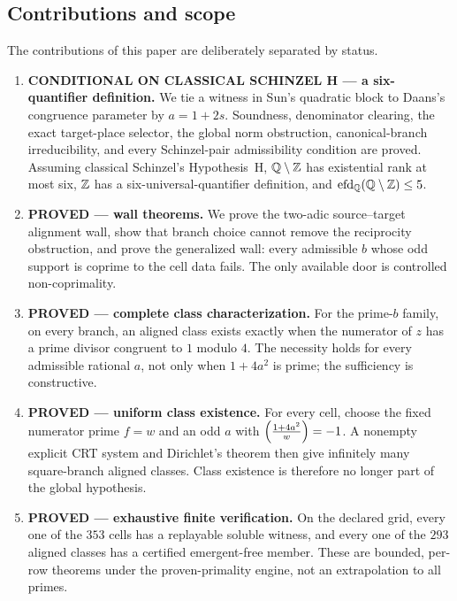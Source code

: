 \subsection{Contributions and scope}

The contributions of this paper are deliberately separated by status.

\begin{enumerate}
\item \textbf{CONDITIONAL ON CLASSICAL SCHINZEL H --- a
six-quantifier definition.}
We tie a witness in Sun's quadratic block to Daans's congruence parameter
by $a=1+2s$.  Soundness, denominator clearing, the exact target-place
selector, the global norm obstruction, canonical-branch irreducibility,
and every Schinzel-pair admissibility condition are proved.  Assuming
classical Schinzel's Hypothesis~H, $\mathbb{Q}\setminus\mathbb{Z}$ has existential rank at
most six, $\mathbb{Z}$ has a six-universal-quantifier definition, and
$\operatorname{efd}_{\mathbb{Q}}(\mathbb{Q}\setminus\mathbb{Z})\le5$.

\item \textbf{PROVED --- wall theorems.}
We prove the two-adic source--target alignment wall, show that branch choice
cannot remove the reciprocity obstruction, and prove the generalized wall:
every admissible $b$ whose odd support is coprime to the cell data fails.
The only available door is controlled non-coprimality.

\item \textbf{PROVED --- complete class characterization.}
For the prime-$b$ family, on every branch, an aligned class exists exactly
when the numerator of $z$ has a prime divisor congruent to $1$ modulo $4$.
The necessity holds for every admissible rational $a$, not only when
$1+4a^2$ is prime; the sufficiency is constructive.

\item \textbf{PROVED --- uniform class existence.}
For every cell, choose the fixed numerator prime $f=w$ and an odd $a$ with
$\left(\frac{1+4a^2}{w}\right)=-1$.  A nonempty explicit CRT system and Dirichlet's
theorem then give infinitely many square-branch aligned classes.  Class
existence is therefore no longer part of the global hypothesis.

\item \textbf{PROVED --- exhaustive finite verification.}
On the declared grid, every one of the $353$ cells has a replayable soluble
witness, and every one of the $293$ aligned classes has a certified
emergent-free member.  These are bounded, per-row theorems under the
proven-primality engine, not an extrapolation to all primes.


\end{enumerate}

